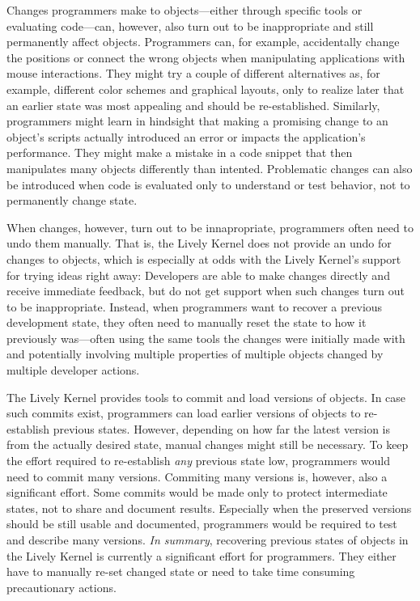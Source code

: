 Changes programmers make to objects---either through specific tools or evaluating code---can, however, also turn out to be inappropriate and still permanently affect objects.
Programmers can, for example, accidentally change the positions or connect the wrong objects when manipulating applications with mouse interactions.
They might try a couple of different alternatives as, for example, different color schemes and graphical layouts, only to realize later that an earlier state was most appealing and should be re-established.
Similarly, programmers might learn in hindsight that making a promising change to an object's scripts actually introduced an error or impacts the application's performance.
They might make a mistake in a code snippet that then manipulates many objects differently than intented.
Problematic changes can also be introduced when code is evaluated only to understand or test behavior, not to permanently change state.

When changes, however, turn out to be innapropriate, programmers often need to undo them manually.
That is, the Lively Kernel does not provide an undo for changes to objects, which is especially at odds with the Lively Kernel's support for trying ideas right away: Developers are able to make changes directly and receive immediate feedback, but do not get support when such changes turn out to be inappropriate.
Instead, when programmers want to recover a previous development state, they often need to manually reset the state to how it previously was---often using the same tools the changes were initially made with and potentially involving multiple properties of multiple objects changed by multiple developer actions.

The Lively Kernel provides tools to commit and load versions of objects.
In case such commits exist, programmers can load earlier versions of objects to re-establish previous states.
However, depending on how far the latest version is from the actually desired state, manual changes might still be necessary.
To keep the effort required to re-establish \emph{any} previous state low, programmers would need to commit many versions.
Commiting many versions is, however, also a significant effort.
Some commits would be made only to protect intermediate states, not to share and document results.
Especially when the preserved versions should be still usable and documented, programmers would be required to test and describe many versions.
\emph{In summary}, recovering previous states of objects in the Lively Kernel is currently a significant effort for programmers.
They either have to manually re-set changed state or need to take time consuming precautionary actions.\\

